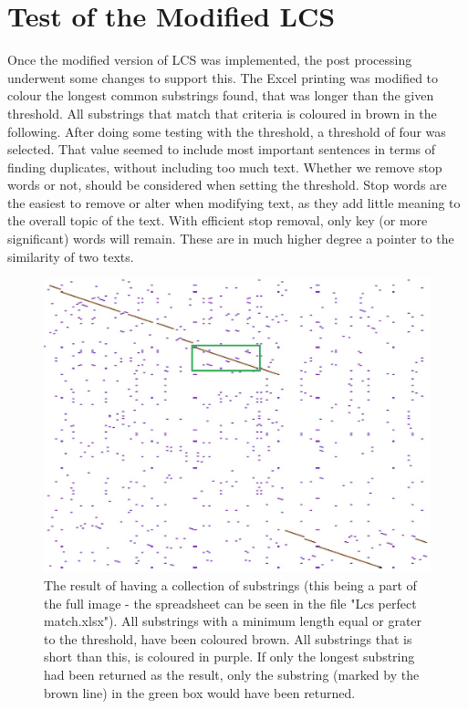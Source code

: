 \section{Test of the Modified LCS}

Once the modified version of LCS was implemented, the post processing underwent some changes to support this. The Excel printing was modified to colour the longest common substrings found, that was longer than the given threshold. All substrings that match that criteria is coloured in brown in the following. After doing some testing with the threshold, a threshold of four was selected. That value seemed to include most important sentences in terms of finding duplicates, without including too much text. Whether we remove stop words or not, should be considered when setting the threshold. Stop words are the easiest to remove or alter when modifying text, as they add little meaning to the overall topic of the text. With efficient stop removal, only key (or more significant) words will remain. These are in much higher degree a pointer to the similarity of two texts.

\begin{figure}
	\centering
	\includegraphics[scale=0.35]{figures/SubstringCollection}
	\caption{The result of having a collection of substrings (this being a part of the full image - the spreadsheet can be seen in the file "Lcs perfect match.xlsx"). All substrings with a minimum length equal or grater to the threshold, have been coloured brown. All substrings that is short than this, is coloured in purple. If only the longest substring had been returned as the result, only the substring (marked by the brown line) in the green box would have been returned.}
	\label{SubstringsEx}
\end{figure}

